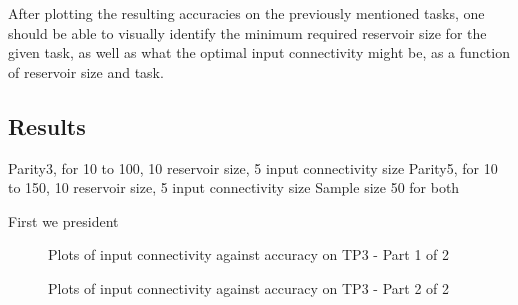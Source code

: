 After plotting the resulting accuracies on the previously mentioned tasks,
one should be able to visually identify the minimum required reservoir size for the given task,
as well as what the optimal input connectivity might be, as a function of reservoir size and task.

\label{experiments:1:results}
\subsection{Results}

Parity3, for 10 to 100, 10 reservoir size, 5 input connectivity size
Parity5, for 10 to 150, 10 reservoir size, 5 input connectivity size
Sample size 50 for both

First we president 

\begin{figure*}[ht]
    \centering
    \resizebox{\textwidth}{!}{
        \subfloat[N=10]{
            
        }
        \subfloat[N=20]{
            
        }
    }
    \resizebox{\textwidth}{!}{
        \subfloat[N=30]{
            
        }
        \subfloat[N=40]{
            
        }
    }
    \resizebox{\textwidth}{!}{
        \subfloat[N=50]{
            
        }
        \subfloat[N=60]{
            
        }
    }
    \label{fig:results:tp3-1}
    \caption{Plots of input connectivity against accuracy on TP3 - Part 1 of 2}
\end{figure*}

\begin{figure*}[h]
    \centering
    \resizebox{\textwidth}{!}{
        \subfloat[N=70]{
            
        }
        \subfloat[N=80]{
            
        }
    }
    \resizebox{\textwidth}{!}{
        \subfloat[N=90]{
            
        }
        \subfloat[N=100]{
            
        }
    }
    \label{fig:results:tp3-2}
    \caption{Plots of input connectivity against accuracy on TP3 - Part 2 of 2}
\end{figure*}

